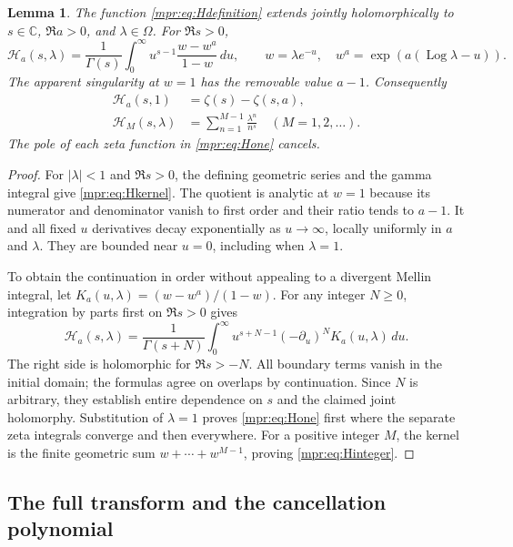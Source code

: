 \documentclass[11pt,letterpaper]{article}
\numberwithin{equation}{section}
\newtheorem{lemma}[theorem]{Lemma}
\theoremstyle{definition}
\theoremstyle{remark}
\begin{document}
\begin{lemma}\label{mpr:lem:H}
The function \eqref{mpr:eq:Hdefinition} extends jointly holomorphically
to $s\in\mathbb C$, $\Re a>0$, and $\lambda\in\Omega$.  For $\Re s>0$,
\begin{equation}\label{mpr:eq:Hkernel}
 \mathcal H_a(s,\lambda)
 =\frac1{\Gamma(s)}\int_0^\infty u^{s-1}
       \frac{w-w^a}{1-w}\,du,
 \qquad w=\lambda e^{-u},\quad
 w^a=\exp(a(\operatorname{Log}\lambda-u)).
\end{equation}
The apparent singularity at $w=1$ has the removable value $a-1$.
Consequently
\begin{align}
 \mathcal H_a(s,1)&=\zeta(s)-\zeta(s,a),
       \label{mpr:eq:Hone}\\
 \mathcal H_M(s,\lambda)&=\sum_{n=1}^{M-1}\frac{\lambda^n}{n^s}
       \quad(M=1,2,\ldots).
       \label{mpr:eq:Hinteger}
\end{align}
The pole of each zeta function in \eqref{mpr:eq:Hone} cancels.
\end{lemma}

\begin{proof}
For $|\lambda|<1$ and $\Re s>0$, the defining geometric series and the
gamma integral give \eqref{mpr:eq:Hkernel}.  The quotient is analytic at
$w=1$ because its numerator and denominator vanish to first order and
their ratio tends to $a-1$.  It and all fixed $u$ derivatives decay
exponentially as $u\to\infty$, locally uniformly in $a$ and $\lambda$.
They are bounded near $u=0$, including when $\lambda=1$.

To obtain the continuation in order without appealing to a divergent
Mellin integral, let $K_a(u,\lambda)=(w-w^a)/(1-w)$.  For any integer
$N\ge0$, integration by parts first on $\Re s>0$ gives
\[
 \mathcal H_a(s,\lambda)
 =\frac1{\Gamma(s+N)}\int_0^\infty
        u^{s+N-1}(-\partial_u)^N K_a(u,\lambda)\,du.
\]
The right side is holomorphic for $\Re s>-N$.  All boundary terms vanish
in the initial domain; the formulas agree on overlaps by continuation.
Since $N$ is arbitrary, they establish entire dependence on $s$ and the
claimed joint holomorphy.  Substitution of $\lambda=1$ proves
\eqref{mpr:eq:Hone} first where the separate zeta integrals converge and
then everywhere.  For a positive integer $M$, the kernel is the finite
geometric sum $w+\cdots+w^{M-1}$, proving
\eqref{mpr:eq:Hinteger}.
\end{proof}

\subsection{The full transform and the cancellation polynomial}
\end{document}
